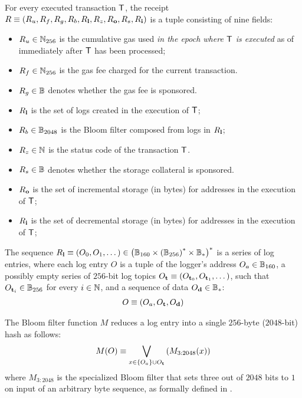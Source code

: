 For every executed transaction $\textsf{T}$, the receipt $R\equiv \left(R_u, R_f, R_g, R_b, R_{\bf l}, R_z,R_{\bf o},R_s,R_{\bf i}\right)$ is a tuple consisting of nine fields:
\begin{itemize}[nosep]
	\item $R_u\in\mathbb{N}_{256}$ is the cumulative gas used \emph{in the epoch where $\textsf{T}$ is executed} as of immediately after $\textsf{T}$ has been processed;
	
	\item $R_f\in\mathbb{N}_{256}$ is the gas fee charged for the current transaction. 
	
	\item $R_g \in \mathbb{B}$ denotes whether the gas fee is sponsored. 

	\item $R_{\bf l}$ is the set of logs created in the execution of $\textsf{T}$;

	\item $R_b\in\mathbb{B}_{2048}$ is the Bloom filter composed from logs in $R_{\bf l}$;

	\item $R_z\in\mathbb{N}$ is the status code of the transaction $\textsf{T}$.
	
	\item $R_s \in \mathbb{B}$ denotes whether the storage collateral is sponsored. 
	
	\item $R_{\bf o}$ is the set of incremental storage (in bytes) for addresses in the execution of $\textsf{T}$;

	\item $R_{\bf i}$ is the set of decremental storage (in bytes) for addresses in the execution of $\textsf{T}$;
\end{itemize}

The sequence $R_{\bf l}\equiv \left(O_0,O_1,\dots\right) \in \left(\mathbb{B}_{160} \times \left(\mathbb{B}_{256}\right)^*\times \mathbb{B}_*\right)^*$ is a series of log entries,
where each log entry $O$ is a tuple of the logger's address $O_a\in \mathbb{B}_{160}$,
a possibly empty series of $256$-bit log topics $O_{\bf t}\equiv \left(O_{{\bf t}_0}, O_{{\bf t}_1},\dots \right)$, such that $O_{{\bf t}_i}\in\mathbb{B}_{256}$ for every $i\in\mathbb{N}$,
and a sequence of data $O_{\bf d}\in\mathbb{B}_*$:
\begin{align}
	O\equiv \left( O_a, O_{\bf t}, O_{\bf d} \right)
\end{align}

The Bloom filter function $M$ reduces a log entry into a single $256$-byte ($2048$-bit) hash as follows:
\begin{align}
 	M(O)\equiv \bigvee_{x\in{\left \{{O_a} \right \}}\cup O_{\bf t}}\left( M_{3:2048}(x) \right)
\end{align} 
where $M_{3:2048}$ is the specialized Bloom filter that sets three out of $2048$ bits to $1$ on input of an arbitrary byte sequence,
as formally defined in \cite{ETH_yellow}.

